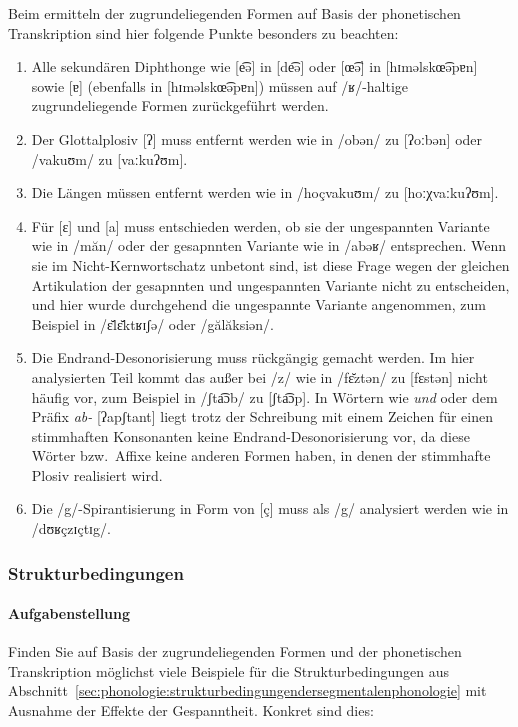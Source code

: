 Beim ermitteln der zugrundeliegenden Formen auf Basis der phonetischen Transkription sind hier folgende Punkte besonders zu beachten:

\begin{enumerate}
  \item Alle sekundären Diphthonge wie [e͡ə] in [de͡ə] oder [œ͡ə] in [hɪməlskœ͡əpɐn] sowie [ɐ] (ebenfalls in [hɪməlskœ͡əpɐn]) müssen auf /ʁ/-haltige zugrundeliegende Formen zurückgeführt werden.
  \item Der Glottalplosiv [ʔ] muss entfernt werden wie in /obən/ zu [ʔoːbən] oder /vakuʊm/ zu [vaːkuʔʊm].
  \item Die Längen müssen entfernt werden wie in /hoçvakuʊm/ zu [hoːχvaːkuʔʊm].
  \item Für [ɛ] und [a] muss entschieden werden, ob sie der ungespannten Variante wie in /măn/ oder der gesapnnten Variante wie in /abəʁ/ entsprechen.
    Wenn sie im Nicht-Kernwortschatz unbetont sind, ist diese Frage wegen der gleichen Artikulation der gesapnnten und ungespannten Variante nicht zu entscheiden, und hier wurde durchgehend die ungespannte Variante angenommen, zum Beispiel in /ɛ̆lɛ̆ktʁɪʃə/ oder /gălăksiən/.
  \item Die Endrand-Desonorisierung muss rückgängig gemacht werden.
    Im hier analysierten Teil kommt das außer bei /z/ wie in /fɛ̆ztən/ zu [fɛstən] nicht häufig vor, zum Beispiel in /ʃta͡ɔb/ zu [ʃta͡ɔp].
    In Wörtern wie \textit{und} oder dem Präfix \textit{ab-} [ʔapʃtant] liegt trotz der Schreibung mit einem Zeichen für einen stimmhaften Konsonanten keine Endrand-Desonorisierung vor, da diese Wörter bzw.\ Affixe keine anderen Formen haben, in denen der stimmhafte Plosiv realisiert wird.
  \item Die /g/-Spirantisierung in Form von [ç] muss als /g/ analysiert werden wie in /dʊʁçzɪçtɪg/.
\end{enumerate}



\subsubsection{Strukturbedingungen}

\paragraph*{Aufgabenstellung}

Finden Sie auf Basis der zugrundeliegenden Formen und der phonetischen Transkription möglichst viele Beispiele für die Strukturbedingungen aus Abschnitt~\ref{sec:phonologie:strukturbedingungendersegmentalenphonologie} mit Ausnahme der Effekte der Gespanntheit.
Konkret sind dies:

